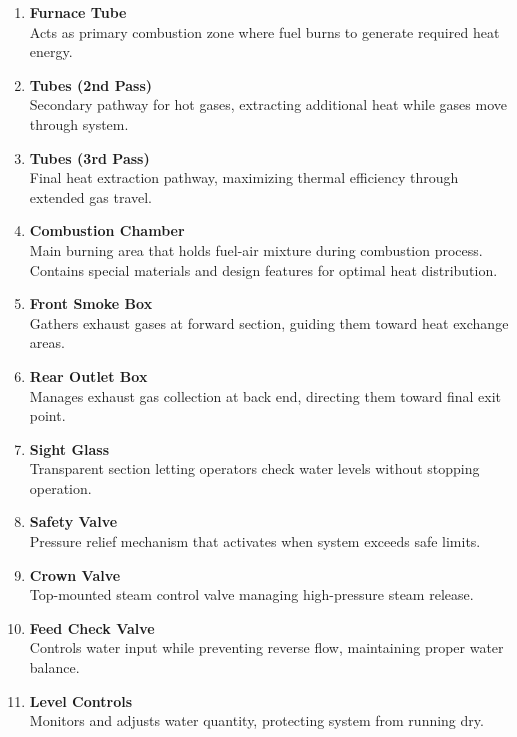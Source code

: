 \begin{enumerate}
    \item \textbf{Furnace Tube}\\
    Acts as primary combustion zone where fuel burns to generate required heat energy.

    \item \textbf{Tubes (2nd Pass)}\\
    Secondary pathway for hot gases, extracting additional heat while gases move through system.

    \item \textbf{Tubes (3rd Pass)}\\
    Final heat extraction pathway, maximizing thermal efficiency through extended gas travel.

    \item \textbf{Combustion Chamber}\\
    Main burning area that holds fuel-air mixture during combustion process. Contains special materials and design features for optimal heat distribution.

    \item \textbf{Front Smoke Box}\\
    Gathers exhaust gases at forward section, guiding them toward heat exchange areas.

    \item \textbf{Rear Outlet Box}\\
    Manages exhaust gas collection at back end, directing them toward final exit point.

    \item \textbf{Sight Glass}\\
    Transparent section letting operators check water levels without stopping operation.

    \item \textbf{Safety Valve}\\
    Pressure relief mechanism that activates when system exceeds safe limits.

    \item \textbf{Crown Valve}\\
    Top-mounted steam control valve managing high-pressure steam release.

    \item \textbf{Feed Check Valve}\\
    Controls water input while preventing reverse flow, maintaining proper water balance.

    \item \textbf{Level Controls \cite{level_control}}\\ 
    Monitors and adjusts water quantity, protecting system from running dry.


\end{enumerate}
